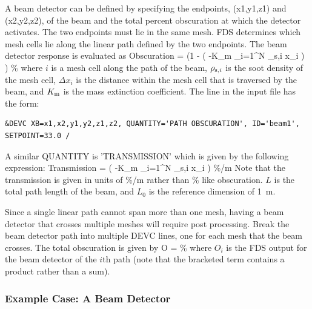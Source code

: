 \documentclass[11pt]{book}
\begin{document}
A beam detector can be defined by specifying the endpoints, {\ct (x1,y1,z1) and (x2,y2,z2)}, of the beam and the
total percent obscuration at which the detector activates.  The two endpoints must lie in the same mesh.  FDS determines which mesh
cells lie along the linear path defined by the two endpoints.  The beam detector response is evaluated as
\be
  \hbox{Obscuration}  = \left(1 - \exp \left( -K_{\rm m} \sum_{i=1}^N {\rho_{{\rm s},i}\; \Delta x_i} \right)  \right)   \; \; \hbox{\%}
\ee
where $i$ is a mesh cell along the path of the beam, $\rho_{{\rm s},i}$ is the soot density of the mesh cell, $ \Delta x_i$
is the distance within the mesh cell that is traversed by the beam, and $K_{\rm m}$ is the mass extinction coefficient. The line in the input file has the form:
\begin{lstlisting}
&DEVC XB=x1,x2,y1,y2,z1,z2, QUANTITY='PATH OBSCURATION', ID='beam1', SETPOINT=33.0 /
\end{lstlisting}
A similar {\ct QUANTITY} is {\ct 'TRANSMISSION'} which is given by the following expression:
\be
  \hbox{Transmission}  = \exp \left( -K_{\rm m}  \sum_{i=1}^N {\rho_{{\rm s},i}\; \Delta x_i} \right)    \; \; \hbox{\%/m}
\ee
Note that the transmission is given in units of \%/m rather than \% like obscuration. $L$ is the total path length of the beam, and $L_0$ is the reference dimension of 1~m.

Since a single linear path cannot span more than one mesh, having a beam detector that crosses multiple meshes will require post processing.
Break the beam detector path into multiple {\ct DEVC} lines, one for each mesh that the beam crosses.  The total obscuration is given by
\be
  O  = \left[ 1 -  \prod_{i=1}^N \left( 1-O_i/100 \right)  \right]   \; \hbox{\%}
\ee
where $O_i$ is the FDS output for the beam detector of the $i$th path (note that the bracketed term contains a product rather than a sum).

\subsubsection{Example Case: A Beam Detector}
\end{document}
